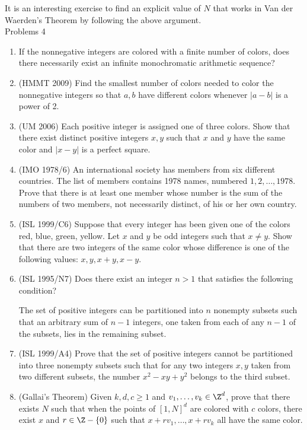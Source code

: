 It is an interesting exercise to find an explicit value of $N$ that works in Van der Waerden's Theorem by following the above argument.\\

{\Large Problems 4}
\begin{enumerate}
\item If the nonnegative integers are colored with a finite number of colors, does there necessarily exist an infinite monochromatic arithmetic sequence?
\item (HMMT 2009) Find the smallest number of colors needed to color the nonnegative integers so that $a,b$ have different colors whenever $|a-b|$ is a power of 2.
\item (UM 2006) Each positive integer is assigned one of three colors. Show that there exist distinct positive integers $x,y$ such that $x$ and $y$ have the same color and $|x-y|$ is a perfect square.
\item (IMO 1978/6) An international society has members from six different countries. The list of members contains 1978 names, numbered $1,2,\ldots, 1978$. Prove that there is at least one member whose number is the sum of the numbers of two members, not necessarily distinct, of his or her own country.
\item (ISL 1999/C6) Suppose that every integer has been given one of the colors red, blue, green, yellow. Let $x$ and $y$ be odd integers such that $x\neq y$. Show that there are two integers of the same color whose difference is one of the following values: $x,y,x+y,x-y$.
\item (ISL 1995/N7) Does there exist an integer $n>1$ that satisfies the following condition?

The set of positive integers can be partitioned into $n$ nonempty subsets such that an arbitrary sum of $n-1$ integers, one taken from each of any $n-1$ of the subsets, lies in the remaining subset.
\item (ISL 1999/A4) Prove that the set of positive integers cannot be partitioned into three nonempty subsets such that for any two integers $x,y$ taken from two different subsets, the number $x^2-xy+y^2$ belongs to the third subset.
\item (Gallai's Theorem) Given $k,d,c\geq 1$ and $v_1,\ldots, v_k\in \Z^d$, prove that there exists $N$ such that when the points of $[1,N]^d$ are colored with $c$ colors, there exist $x$ and $r\in \Z-\{0\}$ such that $x+rv_1,\ldots, x+rv_k$ all have the same color. 
\end{enumerate}
